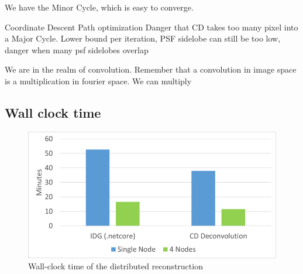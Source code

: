 We have the Minor Cycle, which is easy to converge.

Coordinate Descent Path optimization \cite{friedman2010regularization}
Danger that CD takes too many pixel into a Major Cycle. Lower bound per iteration, PSF sidelobe
can still be too low, danger when many psf sidelobes overlap


We are in the realm of convolution. Remember that a convolution in image space is a multiplication in fourier space.
We can multiply

\subsection{Wall clock time}
\begin{figure}[h]
	\centering
	\includegraphics[width=0.80\linewidth]{./chapters/10.results/wall-clock-time.png}
	\caption{Wall-clock time of the distributed reconstruction}
	\label{results:time:fig}
\end{figure}
